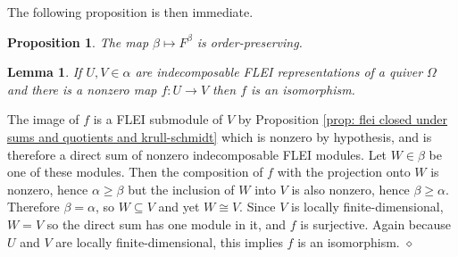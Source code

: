 \documentclass{article}
\newcommand{\maps}{:}
\newtheorem{lemma}{Lemma}[section]
\newtheorem{proposition}{Proposition}[section]
\newtheorem{definition}{Definition}
\newtheorem{remark}{Remark}[section]
\newenvironment{proof}{\vspace*{2ex}\noindent {\em Proof:}
}{\hfill $\diamond$ \\[2ex]}
\begin{document}
The following proposition is then immediate.
\begin{proposition}
The map $\beta \mapsto F^\beta$ is order-preserving. 
\end{proposition}

\begin{lemma} \label{lem: nonzero maps between isomorphic indecomposables are isomorphisms}
    If $U , V \in \alpha$ are indecomposable FLEI representations of a quiver $\Omega$ and there is a nonzero map $f : U \to V$ then $f$ is an isomorphism. 
\end{lemma}

\begin{proof}
The image of $f$ is a FLEI submodule of $V$ by Proposition \ref{prop: flei closed under sums and quotients and krull-schmidt} which is nonzero by hypothesis, and is therefore a direct sum of nonzero indecomposable FLEI modules. Let $W \in \beta$ be one of these modules. Then the composition of $f$ with the projection onto $W$ is nonzero, hence $\alpha \geq \beta$ but the inclusion of $W$ into $V$ is also nonzero, hence $\beta \geq \alpha$. Therefore $\beta = \alpha$, so $W \subseteq V$ and yet $W \cong V$. Since $V$ is locally finite-dimensional, $W = V$ so the direct sum has one module in it, and $f$ is surjective. Again because $U$ and $V$ are locally finite-dimensional, this implies $f$ is an isomorphism. 
\end{proof}




\end{document}

